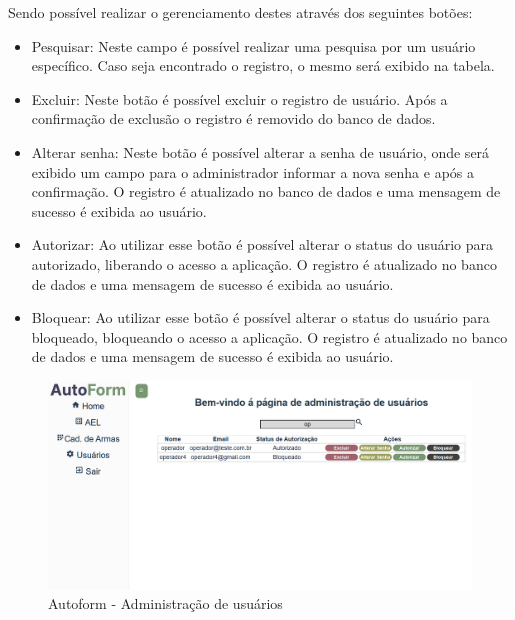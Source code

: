 Sendo possível realizar o gerenciamento destes através dos seguintes botões:
\begin{itemize}
    \item Pesquisar: Neste campo é possível realizar uma pesquisa por um usuário específico. Caso seja encontrado o registro, o mesmo será exibido na tabela.
    \item Excluir: Neste botão é possível excluir o registro de usuário. Após a confirmação de exclusão o registro é removido do banco de dados.
    \item Alterar senha: Neste botão é possível alterar a senha de usuário, onde será exibido um campo para o administrador informar a nova senha e após a confirmação. O registro é atualizado no banco de dados e uma mensagem de sucesso é exibida ao usuário.
    \item Autorizar: Ao utilizar esse botão é possível alterar o status do usuário para autorizado, liberando o acesso a aplicação. O registro é atualizado no banco de dados e uma mensagem de sucesso é exibida ao usuário.
    \item Bloquear: Ao utilizar esse botão é possível alterar o status do usuário para bloqueado, bloqueando o acesso a aplicação. O registro é atualizado no banco de dados e uma mensagem de sucesso é exibida ao usuário.
\end{itemize}

\begin{figure}[H]
    \caption{\label{fig:tela-configuracoes}Autoform - Administração de usuários}
    \begin{center}
        \includegraphics[scale=0.5]{imagens/autoform-configuracoes.png}
    \end{center}
\end{figure}




